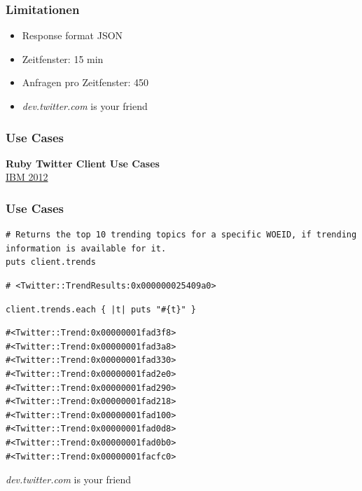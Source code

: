 \documentclass{beamer}
\begin{document}
\begin{frame}
  \frametitle{Limitationen}
  \begin{itemize}
    \item Response format JSON \pause
    \item Zeitfenster: 15 min\pause
    \item Anfragen pro Zeitfenster: 450\pause
    \item \textit{dev.twitter.com} is your friend
  \end{itemize}
\end{frame}

\begin{frame}
  \frametitle{Use Cases}
  \begin{center}
    \textbf{Ruby Twitter Client Use Cases}\\
    \hyperlink{http://www.ibm.com/developerworks/library/os-dataminingrubytwitter}{IBM 2012}
  \end{center}
\end{frame}

\begin{frame}[fragile]
  \frametitle{Use Cases}
  \begin{lstlisting}
# Returns the top 10 trending topics for a specific WOEID, if trending information is available for it.
puts client.trends
\end{lstlisting}\pause
\begin{lstlisting}
# <Twitter::TrendResults:0x000000025409a0>
\end{lstlisting}\pause
\begin{lstlisting}
client.trends.each { |t| puts "#{t}" }
\end{lstlisting}\pause
\begin{lstlisting}
#<Twitter::Trend:0x00000001fad3f8>
#<Twitter::Trend:0x00000001fad3a8>
#<Twitter::Trend:0x00000001fad330>
#<Twitter::Trend:0x00000001fad2e0>
#<Twitter::Trend:0x00000001fad290>
#<Twitter::Trend:0x00000001fad218>
#<Twitter::Trend:0x00000001fad100>
#<Twitter::Trend:0x00000001fad0d8>
#<Twitter::Trend:0x00000001fad0b0>
#<Twitter::Trend:0x00000001facfc0>
\end{lstlisting}\pause
\textit{dev.twitter.com} is your friend
\end{frame}
\end{document}

